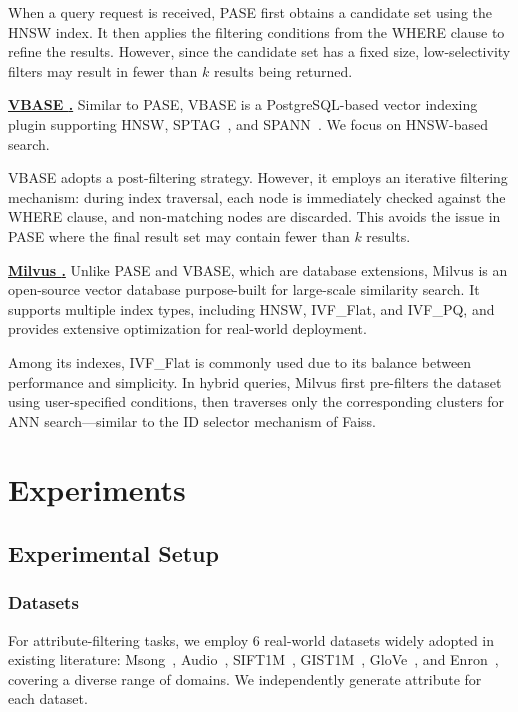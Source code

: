 \documentclass[sigconf, nonacm]{acmart}
\begin{document}
When a query request is received, PASE first obtains a candidate set using the HNSW index. It then applies the filtering conditions from the WHERE clause to refine the results. However, since the candidate set has a fixed size, low-selectivity filters may result in fewer than $k$ results being returned.


\noindent\textbf{\underline{VBASE \cite{vbase}.}}  
Similar to PASE, VBASE is a PostgreSQL-based vector indexing plugin supporting HNSW, SPTAG~\cite{sptag}, and SPANN~\cite{spann}. We focus on HNSW-based search.

VBASE adopts a post-filtering strategy. However, it employs an iterative filtering mechanism: during index traversal, each node is immediately checked against the WHERE clause, and non-matching nodes are discarded. This avoids the issue in PASE where the final result set may contain fewer than $k$ results.


\noindent\textbf{\underline{Milvus \cite{milvus}.}}  
Unlike PASE and VBASE, which are database extensions, Milvus is an open-source vector database purpose-built for large-scale similarity search. It supports multiple index types, including HNSW, IVF\_Flat, and IVF\_PQ, and provides extensive optimization for real-world deployment.

Among its indexes, IVF\_Flat is commonly used due to its balance between performance and simplicity. In hybrid queries, Milvus first pre-filters the dataset using user-specified conditions, then traverses only the corresponding clusters for ANN search—similar to the ID selector mechanism of Faiss.

\section{Experiments}
\subsection{Experimental Setup}
\subsubsection{Datasets}

For attribute-filtering tasks, we employ 6 real-world datasets widely adopted in existing literature: Msong~\cite{msong2011}, Audio~\cite{audio_unknown}, SIFT1M~\cite{sift2010}, GIST1M~\cite{sift2010}, GloVe~\cite{GloVe2015}, and Enron~\cite{enron2015}, covering a diverse range of domains. We independently generate attribute for each dataset.
\end{document}
